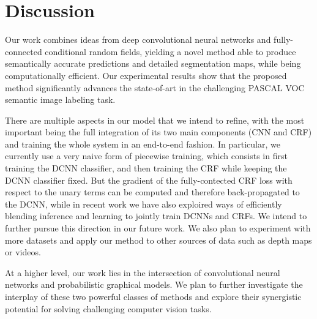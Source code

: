 \section{Discussion}
\label{sec:discussion}

Our work combines ideas from deep convolutional neural networks and
fully-connected conditional random fields, yielding a novel method able to
produce semantically accurate predictions and detailed segmentation maps,
while being computationally efficient. Our experimental results show that the
proposed method significantly advances the state-of-art in the challenging
PASCAL VOC semantic image labeling task.

There are multiple aspects in our model that we intend to refine, with the most important being the 
full integration of its two main components (CNN and CRF) and training the whole
system in an end-to-end fashion.  In particular, we currently use a very naive form of piecewise training, which consists in first training the DCNN classifier, and then training the CRF while keeping the DCNN classifier fixed. But  the gradient of the fully-contected CRF loss  with respect to the unary terms can be computed \cite{Koltun13} and therefore
back-propagated to the DCNN, while in recent work \citet{chen2014learning} we have also exploired ways of efficiently blending inference and learning to jointly train DCNNs and CRFs. We intend to further pursue this direction in our future work. 
We also plan to experiment with more datasets
and apply our method to other sources of data such as depth maps or videos.

At a higher level, our work lies in the intersection of convolutional neural
networks and probabilistic graphical models. We plan to further investigate
the interplay of these two powerful classes of methods and explore their
synergistic potential for solving challenging computer vision tasks.
